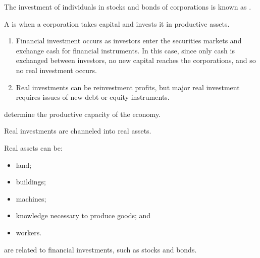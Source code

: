 \documentclass[notoc,notitlepage]{tufte-book}
\begin{document}
\begin{defn}\label{defn:financial_investment}
  The investment of individuals in stocks and bonds of corporations
  is known as .
\end{defn}

\begin{defn}\label{defn:real_investment}
  A is when a corporation takes capital
  and invests it in productive assets.
\end{defn}

\begin{remark}
  \begin{enumerate}
    \item Financial investment occurs as investors enter the securities markets
      and exchange cash for financial instruments.
      In this case, since only cash is exchanged between investors,
      no new capital reaches the corporations,
      and so no real investment occurs.
    \item Real investments can be reinvestment profits,
      but major real investment requires issues of new debt or equity
      instruments.
  \end{enumerate}
\end{remark}

\begin{defn}\label{defn:real_assets}
   determine the productive capacity of the economy.
\end{defn}

\begin{remark}
  Real investments are channeled into real assets.
\end{remark}

\begin{eg}
  Real assets can be:
  \begin{itemize}
    \item land;
    \item buildings;
    \item machines;
    \item knowledge necessary to produce goods; and
    \item workers.
  \end{itemize}
\end{eg}

\begin{defn}\label{defn:financial_assets}
   are related to financial investments,
  such as stocks and bonds.
\end{defn}
\end{document}
